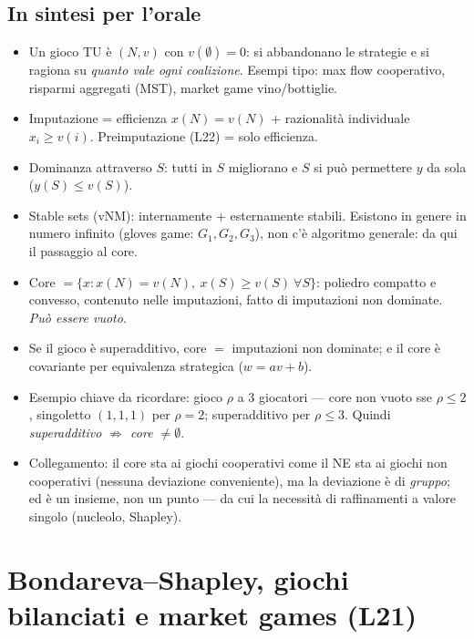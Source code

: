 \documentclass[12pt,a4paper,twoside]{book}
\theoremstyle{plain}
\theoremstyle{definition}
\begin{document}
\section*{In sintesi per l'orale}
\begin{itemize}
  \item Un gioco TU è $(N,v)$ con $v(\emptyset)=0$: si abbandonano le strategie e
        si ragiona su \emph{quanto vale ogni coalizione}. Esempi tipo: max flow
        cooperativo, risparmi aggregati (MST), market game vino/bottiglie.
  \item Imputazione = efficienza $x(N)=v(N)$ + razionalità individuale
        $x_i\ge v(i)$. Preimputazione (L22) = solo efficienza.
  \item Dominanza attraverso $S$: tutti in $S$ migliorano e $S$ si può permettere
        $y$ da sola ($y(S)\le v(S)$).
  \item Stable sets (vNM): internamente + esternamente stabili. Esistono in
        genere in numero infinito (gloves game: $G_1,G_2,G_3$), non c'è
        algoritmo generale: da qui il passaggio al core.
  \item Core $=\{x: x(N)=v(N),\ x(S)\ge v(S)\ \forall S\}$: poliedro compatto e
        convesso, contenuto nelle imputazioni, fatto di imputazioni non dominate.
        \emph{Può essere vuoto}.
  \item Se il gioco è superadditivo, core $=$ imputazioni non dominate; e il
        core è covariante per equivalenza strategica ($w=av+b$).
  \item Esempio chiave da ricordare: gioco $\rho$ a 3 giocatori --- core non vuoto
        sse $\rho\le 2$, singoletto $(1,1,1)$ per $\rho=2$; superadditivo per
        $\rho\le 3$. Quindi \emph{superadditivo $\not\Rightarrow$ core $\ne\emptyset$}.
  \item Collegamento: il core sta ai giochi cooperativi come il NE sta ai giochi
        non cooperativi (nessuna deviazione conveniente), ma la deviazione è di
        \emph{gruppo}; ed è un insieme, non un punto --- da cui la necessità di
        raffinamenti a valore singolo (nucleolo, Shapley).
\end{itemize}

\chapter{Bondareva--Shapley, giochi bilanciati e market games (L21)}
\label{ch:bondareva}
\end{document}
